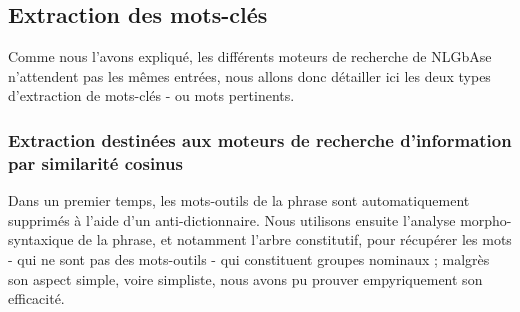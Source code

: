 \documentclass[10pt,a4paper]{article}
\begin{document}

\subsection{Extraction des mots-clés}

\par Comme nous l'avons expliqué, les différents moteurs de recherche de NLGbAse n'attendent pas les mêmes entrées, nous allons donc détailler ici les deux types d'extraction de mots-clés - ou mots pertinents.

\subsubsection{Extraction destinées aux moteurs de recherche d'information par similarité cosinus}
\par Dans un premier temps, les mots-outils de la phrase sont automatiquement supprimés à l'aide d'un anti-dictionnaire. Nous utilisons ensuite l'analyse morpho-syntaxique de la phrase, et notamment l'arbre constitutif, pour récupérer les mots - qui ne sont pas des mots-outils - qui constituent groupes nominaux ; malgrès son aspect simple, voire simpliste, nous avons pu prouver empyriquement son efficacité.
\end{document}
